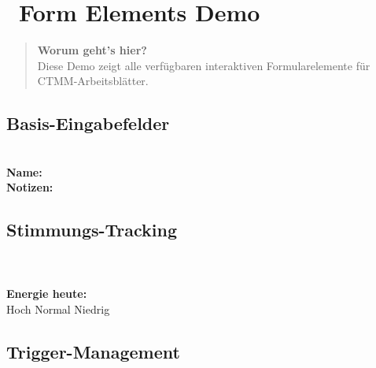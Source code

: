 
\section*{\textcolor{ctmmOrange}{\faCog~Form Elements Demo}}

\begin{quote}
\textbf{\textcolor{ctmmOrange}{Worum geht's hier?}}\\
Diese Demo zeigt alle verfügbaren interaktiven Formularelemente für CTMM-Arbeitsblätter.
\end{quote}

\subsection*{\textcolor{ctmmBlue}{Basis-Eingabefelder}}

\begin{ctmmBlueBox}[title=Standard-Eingaben]
 \quad {}\\[0.3cm]

\textbf{Name:} \\[0.3cm]

\textbf{Notizen:}\\
\end{ctmmBlueBox}

\subsection*{\textcolor{ctmmGreen}{Stimmungs-Tracking}}

\begin{ctmmGreenBox}[title=Emotionale Bewertung]
\\[0.5cm]

\\[0.3cm]

\textbf{Energie heute:}\\
 Hoch \quad {} Normal \quad {} Niedrig
\end{ctmmGreenBox}

\subsection*{\textcolor{ctmmOrange}{Trigger-Management}}

